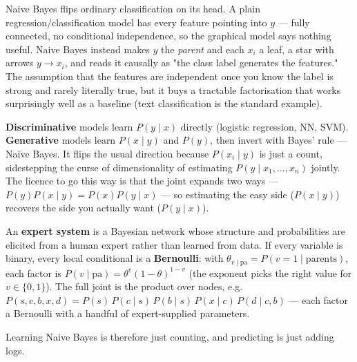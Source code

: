 \documentclass[11pt, a4paper]{article}
\newcommand{\kw}[1]{\textbf{#1}}
\begin{document}
Naive Bayes flips ordinary classification on its head. A plain regression/classification model has
every feature pointing into $y$ — fully connected, no conditional independence, so the graphical
model says nothing useful. Naive Bayes instead makes $y$ the \emph{parent} and each $x_i$ a leaf, a
star with arrows $y\to x_i$, and reads it causally as "the class label generates the features." The
assumption that the features are independent once you know the label is strong and rarely literally
true, but it buys a tractable factorisation that works surprisingly well as a baseline (text
classification is the standard example).

\begin{notebox}
\kw{Discriminative} models learn $P(y\mid x)$ directly (logistic regression, NN, SVM).
\kw{Generative} models learn $P(x\mid y)$ and $P(y)$, then invert with Bayes' rule — Naive Bayes.
It flips the usual direction because $P(x_i\mid y)$ is just a count, sidestepping the curse of
dimensionality of estimating $P(y\mid x_1,\dots,x_n)$ jointly. The licence to go this way is that the
joint expands two ways — $P(y)P(x\mid y)=P(x)P(y\mid x)$ — so estimating the easy side
($P(x\mid y)$) recovers the side you actually want ($P(y\mid x)$).
\end{notebox}

\begin{notebox}[expert systems = a Bayesian network with Bernoulli factors]
An \kw{expert system} is a Bayesian network whose structure and probabilities are elicited from a
human expert rather than learned from data. If every variable is binary, every local conditional is
a \kw{Bernoulli}: with $\theta_{v\mid\text{pa}}=P(v{=}1\mid\text{parents})$, each factor is
$P(v\mid\text{pa})=\theta^{v}(1-\theta)^{1-v}$ (the exponent picks the right value for $v\in\{0,1\}$).
The full joint is the product over nodes, e.g.\
$P(s,c,b,x,d)=P(s)\,P(c\mid s)\,P(b\mid s)\,P(x\mid c)\,P(d\mid c,b)$ — each factor a Bernoulli with a
handful of expert-supplied parameters.
\end{notebox}

Learning Naive Bayes is therefore just counting, and predicting is just adding logs.
\end{document}
